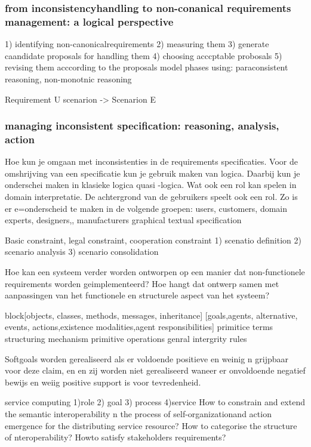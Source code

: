 \subsubsection{from inconsistencyhandling to non-conanical requirements management: a logical perspective}

1) identifying non-canonicalrequirements
2) measuring them
3) generate caandidate proposals for handling them
4) choosing acccptable probosals
5) revising them acccording to the proposals
model phases using: paraconsistent reasoning, non-monotnic reasoning

Requirement U scenarion -> Scenarion E


\subsubsection{managing inconsistent specification: reasoning, analysis, action}
Hoe kun je omgaan met inconsistenties in de requirements specificaties.
Voor de omshrijving van een specificatie kun je gebruik maken van logica. Daarbij kun je onderschei maken in klasieke logica quasi -logica.
Wat ook een rol kan spelen in domain interpretatie. De achtergrond van de gebruikers speelt ook een rol.
Zo is er e=onderscheid te maken in de volgende groepen: users, customers, domain experts, designers,, manufacturers
graphical  textual specification

Basic constraint, legal constraint, cooperation constraint
1) scenatio  definition
2) scenario analysis
3) scenario consolidation


Hoe kan een systeem verder worden ontworpen op een manier dat non-functionele requirements worden geimplementeerd?
Hoe hangt dat ontwerp samen met aanpassingen van het functionele en structurele aspect van het systeem?

block[objects, classes, methods, messages, inheritance]
[goals,agents, alternative, events, actions,existence modalities,agent responsibilities]
primitice terms
structuring mechanism
primitive operations
genral intergrity rules

 
Softgoals worden gerealiseerd als er voldoende positieve en weinig n grijpbaar voor deze claim, en en zij worden niet gerealiseerd waneer er onvoldoende negatief bewijs  en weiig positive support is voor tevredenheid.


service computing
1)role
2) goal
3) process
4)service
How to constrain and extend the semantic interoperability n the process of self-organizationand action emergence for the distributing service resource?
How to categorise the  structure of nteroperability?
Howto satisfy stakeholders requirements?


